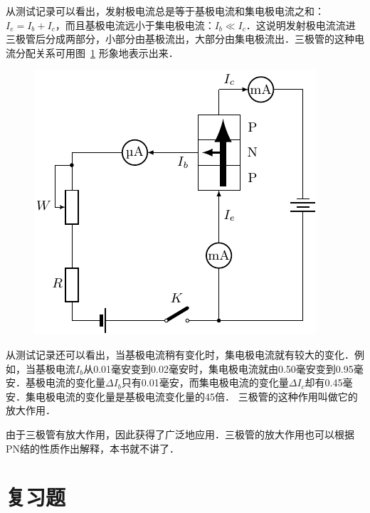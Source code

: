 从测试记录可以看出，发射极电流总是等于基极电流和集电极电流之和：$I_e=I_b+I_c$，而且基极电流远小于集电极电流：$I_b\ll I_c$．这说明发射极电流流进三极管后分成两部分，小部分由基极流出，大部分由集电极流出．三极管的这种电流分配关系可用图~\ref{fig_B_8-31} 形象地表示出来．
\begin{figure}[htbp]
    \centering
    \includegraphics{fig/B/8-31.pdf}
    \caption{}\label{fig_B_8-31}
\end{figure}

从测试记录还可以看出，当基极电流稍有变化时，集电极电流就有较大的变化．例如，当基极电流$I_b$从0.01毫安变到0.02毫安时，集电极电流就由0.50毫安变到0.95毫安．基极电流的变化量$\Delta I_b$只有0.01毫安，而集电极电流的变化量$\Delta I_c$却有0.45毫安．集电极电流的变化量是基极电流变化量的45倍．
三极管的这种作用叫做它的放大作用．

由于三极管有放大作用，因此获得了广泛地应用．三极管的放大作用也可以根据PN结的性质作出解释，本书就不讲了．


\section*{复习题}

